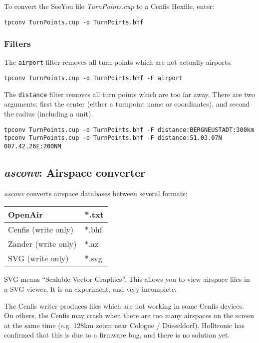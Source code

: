 \documentclass{article}
\begin{document}
To convert the SeeYou file {\em TurnPoints.cup} to a Cenfis Hexfile,
enter:

\begin{verbatim}
tpconv TurnPoints.cup -o TurnPoints.bhf
\end{verbatim}

\subsubsection{Filters}

The \texttt{airport} filter removes all turn points which are not
actually airports:

\begin{verbatim}
tpconv TurnPoints.cup -o TurnPoints.bhf -F airport
\end{verbatim}

The \texttt{distance} filter removes all turn points which are too far
away.  There are two arguments: first the center (either a turnpoint
name or coordinates), and second the radius (including a unit).

\begin{verbatim}
tpconv TurnPoints.cup -o TurnPoints.bhf -F distance:BERGNEUSTADT:300km
tpconv TurnPoints.cup -o TurnPoints.bhf -F distance:51.03.07N 007.42.26E:200NM
\end{verbatim}


\subsection{{\em asconv}: Airspace converter}

{\em asconv} converts airspace databases between several formats:

\begin{tabular}{|l|l|}
\hline
OpenAir & *.txt \\
\hline
Cenfis (write only) & *.bhf \\
\hline
Zander (write only) & *.az \\
\hline
SVG (write only) & *.svg \\
\hline
\end{tabular}

SVG means ``Scalable Vector Graphics''.  This allows you to view
airspace files in a SVG viewer.  It is an experiment, and very
incomplete.

The Cenfis writer produces files which are not working in some Cenfis
devices.  On others, the Cenfis may crash when there are too many
airspaces on the screen at the same time (e.g. 128km zoom near Cologne
/ D\"usseldorf).  Holltronic has confirmed that this is due to a
firmware bug, and there is no solution yet.
\end{document}
